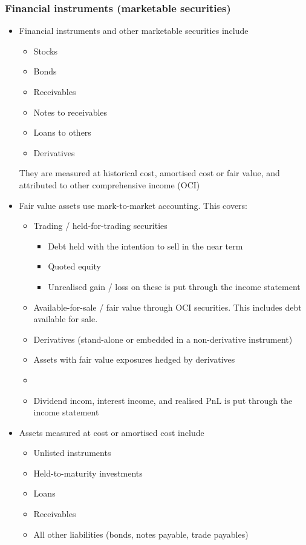 \documentclass[../notes_compiled.tex]{subfiles}
\begin{document}
\subsubsection{Financial instruments (marketable securities)}
\begin{itemize}
\item Financial instruments and other marketable securities include
\begin{multicols}{2}
\begin{itemize}
\item Stocks
\item Bonds
\item Receivables
\item Notes to receivables
\item Loans to others
\item Derivatives
\end{itemize}
\end{multicols}
They are measured at historical cost, amortised cost or fair value, and attributed to other comprehensive income (OCI)

\item Fair value assets use mark-to-market accounting. This covers:
\begin{itemize}
\item Trading / held-for-trading securities
\begin{itemize}
\item Debt held with the intention to sell in the near term
\item Quoted equity
\item[] Unrealised gain / loss on these is put through the income statement
\end{itemize}
\item Available-for-sale / fair value through OCI securities. This includes debt available for sale.
\item Derivatives (stand-alone or embedded in a non-derivative instrument)
\item Assets with fair value exposures hedged by derivatives
\item[]
\item[] Dividend incom, interest income, and realised PnL is put through the income statement
\end{itemize}


\item Assets measured at cost or amortised cost include
\begin{multicols}{3}
\begin{itemize}
\item Unlisted instruments
\item Held-to-maturity investments
\item Loans
\item Receivables
\item All other liabilities (bonds, notes payable, trade payables)
\end{itemize}
\end{multicols}


\end{itemize}
\end{document}
